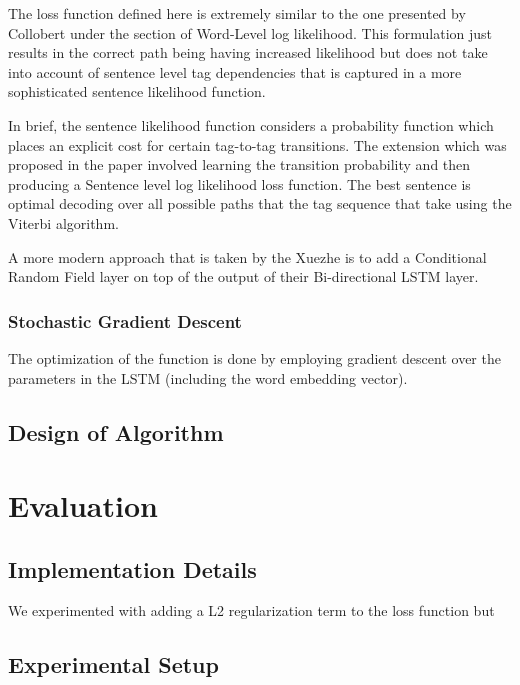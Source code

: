\documentclass[fyp]{socreport}
\begin{document}
The loss function defined here is extremely similar to the one presented by
Collobert \cite{DBLP2011Collobert} under the section of Word-Level log
likelihood. This formulation just results in the correct path being having
increased likelihood but does not take into account of sentence level tag
dependencies that is captured in a more sophisticated sentence likelihood
function.

In brief, the sentence likelihood function considers a probability function
which places an explicit cost for certain tag-to-tag transitions. The extension
which was proposed in the paper involved learning the transition probability
and then producing a Sentence level log likelihood loss function. The best
sentence is optimal decoding over all possible paths that the tag sequence that
take using the Viterbi algorithm.

A more modern approach that is taken by the Xuezhe \cite{2016arXiv160301354M}
is to add a Conditional Random Field layer on top of the output of their Bi-directional
LSTM layer.


\subsection{Stochastic Gradient Descent}

The optimization of the function is done by employing gradient descent over the
parameters in the LSTM (including the word embedding vector).




\section{Design of Algorithm}



\chapter{Evaluation}

\section{Implementation Details}

We experimented with adding a L2 regularization term to the loss function but


\section{Experimental Setup}
\end{document}
